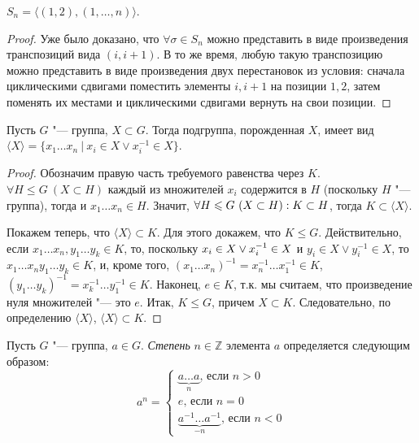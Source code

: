 \begin{proposition}
	$S_n = \langle (1, 2), (1, \dots, n)\rangle$.
\end{proposition}

\begin{proof}
	Уже было доказано, что $\forall \sigma \in S_n$ можно представить в виде произведения транспозиций вида $(i, i+1)$. В то же время, любую такую транспозицию можно представить в виде произведения двух перестановок из условия: сначала циклическими сдвигами поместить элементы $i, i+1$ на позиции $1, 2$, затем поменять их местами и циклическими сдвигами вернуть на свои позиции.
\end{proof}

\begin{proposition}
	Пусть $G$ "--- группа, $X \subset G$. Тогда подгруппа, порожденная $X$, имеет вид $\langle X\rangle = \{x_1\dots x_n~|~x_i \in X \lor x_i^{-1} \in X\}$.
\end{proposition}

\begin{proof}
	Обозначим правую часть требуемого равенства через $K$. $\forall H \le G~(X \subset H)$ каждый из множителей $x_i$ содержится в $H$ (поскольку $H$ "--- группа), тогда и $x_1\dots x_n \in H$. Значит, $\forall H \hm{\le} G~(X \subset H): K \subset H$, тогда $K \subset \langle X\rangle$.
	
	Покажем теперь, что $\langle X\rangle \subset K$. Для этого докажем, что $K \le G$. Действительно, если $x_1\dots x_n, y_1\dots y_k \in K$, то, поскольку $x_i \in X \hm{\lor} x_i^{-1} \in X$ и $y_i \in X \lor y_i^{-1} \in X$, то $x_1\dots x_ny_1\dots y_k \in K$, и, кроме того, $(x_1\dots x_n)^{-1} = x_n^{-1}\dots x_1^{-1} \in K$, $(y_1\dots y_k)^{-1} = x_k^{-1}\dots y_1^{-1} \in K$. Наконец, $e \in K$, т.\:к. мы считаем, что произведение нуля множителей "--- это  $e$. Итак, $K \le G$, причем $X \subset K$. Следовательно, по определению $\langle X\rangle$, $\langle X\rangle \subset K$.
\end{proof}

\begin{definition}
	Пусть $G$ "--- группа, $a \in G$. \textit{Степень} $n \in \mathbb{Z}$ элемента $a$ определяется следующим образом:
	\[a^n = \begin{cases}
	\underbrace{a\dots a}_{n}\text{, если $n > 0$}\\
	e\text{, если $n = 0$}\\
	\underbrace{a^{-1}\dots a^{-1}}_{-n}\text{, если $n < 0$}
	\end{cases}\]
\end{definition}

